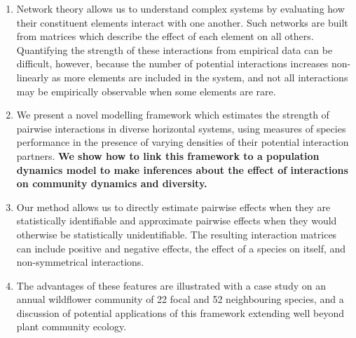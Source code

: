 \documentclass[a4,12pt]{article}
\begin{document}
    \begin{enumerate}
    \item{Network theory allows us to understand complex systems by evaluating how their constituent elements interact with one another. Such networks are built from matrices which describe the effect of each element on all others. Quantifying the strength of these interactions from empirical data can be difficult, however, because the number of potential interactions increases non-linearly as more elements are included in the system, and not all interactions may be empirically observable when some elements are rare.}
    \item{We present a novel modelling framework which estimates the strength of pairwise interactions in diverse horizontal systems, using measures of species performance in the presence of varying densities of their potential interaction partners. \textbf{We show how to link this framework to a population dynamics model to make inferences about the effect of interactions on community dynamics and diversity.}}
    \item{Our method allows us to directly estimate pairwise effects when they are statistically identifiable and approximate pairwise effects when they would otherwise be statistically unidentifiable. The resulting interaction matrices can include positive and negative effects, the effect of a species on itself, and non-symmetrical interactions.} 
    \item{The advantages of these features are illustrated with a case study on an annual wildflower community of 22 focal and 52 neighbouring species, and a discussion of potential applications of this framework extending well beyond plant community ecology.}
\end{enumerate}
\end{document}
